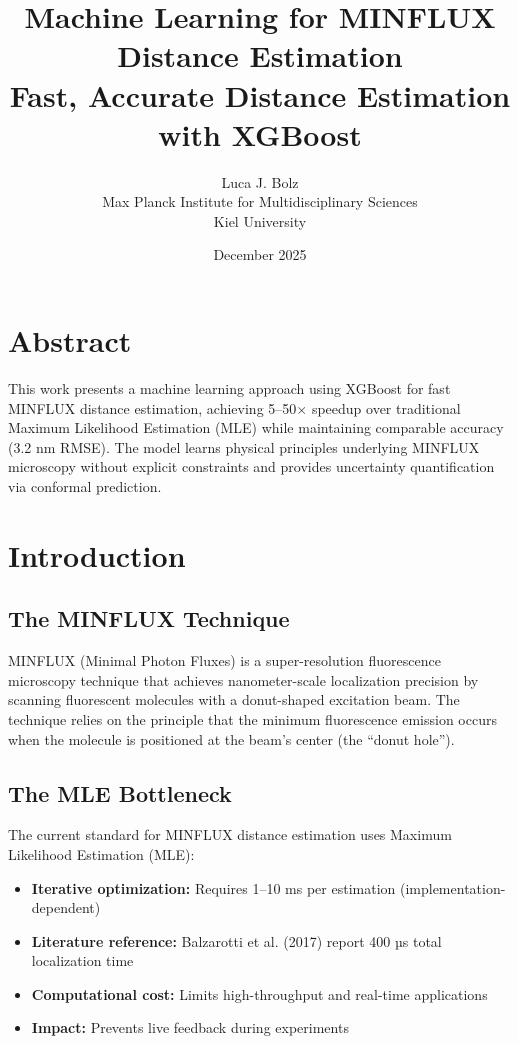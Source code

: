 \documentclass[a4paper,11pt]{article}
\title{\textbf{\color{mpigreen}Machine Learning for MINFLUX Distance Estimation}\\
\large Fast, Accurate Distance Estimation with XGBoost}
\author{Luca J. Bolz\\
Max Planck Institute for Multidisciplinary Sciences\\
Kiel University}
\date{December 2025}
\begin{document}
\maketitle

\section*{Abstract}

This work presents a machine learning approach using XGBoost for fast MINFLUX distance estimation, achieving 5--50$\times$ speedup over traditional Maximum Likelihood Estimation (MLE) while maintaining comparable accuracy (3.2 nm RMSE). The model learns physical principles underlying MINFLUX microscopy without explicit constraints and provides uncertainty quantification via conformal prediction.

\section{Introduction}

\subsection{The MINFLUX Technique}

MINFLUX (Minimal Photon Fluxes) is a super-resolution fluorescence microscopy technique that achieves nanometer-scale localization precision by scanning fluorescent molecules with a donut-shaped excitation beam. The technique relies on the principle that the minimum fluorescence emission occurs when the molecule is positioned at the beam's center (the ``donut hole'').

\subsection{The MLE Bottleneck}

The current standard for MINFLUX distance estimation uses Maximum Likelihood Estimation (MLE):

\begin{itemize}[leftmargin=*]
    \item \textbf{Iterative optimization:} Requires 1--10 ms per estimation (implementation-dependent)
    \item \textbf{Literature reference:} Balzarotti et al. (2017) report 400 µs total localization time
    \item \textbf{Computational cost:} Limits high-throughput and real-time applications
    \item \textbf{Impact:} Prevents live feedback during experiments
\end{itemize}
\end{document}
